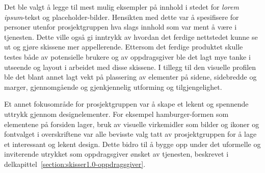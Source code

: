 Det ble valgt å legge til mest mulig eksempler på innhold i stedet for {\em lorem ipsum}-tekst og placeholder-bilder. Hensikten med dette var å spesifisere for personer utenfor prosjektgruppen hva slags innhold som var ment å være i tjenesten. Dette ville også gi inntrykk av hvordan det ferdige nettstedet kunne se ut og gjøre skissene mer appellerende. Ettersom det ferdige produktet skulle testes både av potensielle brukere og av oppdragsgiver ble det lagt mye tanke i utseende og layout i arbeidet med disse skissene. I tillegg til den visuelle profilen ble det blant annet lagt vekt på plassering av elementer på sidene, sidebredde og marger, gjennomgående og gjenkjennelig utforming og tilgjengelighet. 

Et annet fokusområde for prosjektgruppen var å skape et lekent og spennende uttrykk gjennom designelementer. For eksempel hamburger-formen som elementene på forsiden lager, bruk av visuelle virkemidler som bilder og ikoner og fontvalget i overskriftene var alle bevisste valg tatt av prosjektgruppen for å lage et interessant og lekent design. Dette bidro til å bygge opp under det uformelle og inviterende utrykket som oppdragsgiver ønsket av tjenesten, beskrevet i delkapittel~\ref{section:skisser1.0-oppdragsgiver}.

